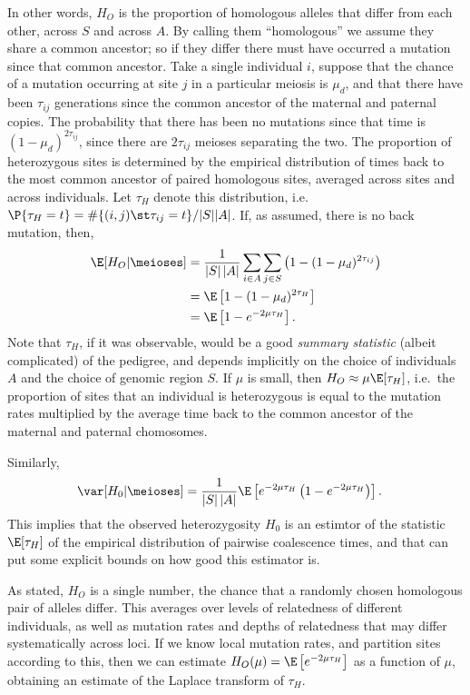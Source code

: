 In other words, $H_O$ is the proportion of homologous alleles that differ from each other, across $S$ and across $A$.
By calling them ``homologous'' we assume they share a common ancestor;
so if they differ there must have occurred a mutation since that common ancestor.
Take a single individual $i$,
suppose that the chance of a mutation occurring at site $j$ in a particular meiosis is $\mu_d$,
and that there have been $\tau_{ij}$ generations since the common ancestor of the maternal and paternal copies.
The probability that there has been no mutations since that time is $(1-\mu_d)^{2 \tau_{ij}}$,
since there are $2 \tau_{ij}$ meioses separating the two.
The proportion of heterozygous sites is determined by the empirical distribution 
of times back to the most common ancestor of paired homologous sites, averaged across sites and across individuals.
Let $\tau_H$ denote this distribution, i.e.\ $\P\{ \tau_H = t \} = \#\{ (i,j) \st \tau_{ij} = t \} / |S||A|$.
If, as assumed, there is no back mutation, then,
\begin{align}
  \E[ H_O \vert \meioses ] &= \frac{1}{|S|\,|A|} \sum_{i \in A} \sum_{j \in S} \left( 1 - (1-\mu_d)^{2 \tau_{ij}} \right) \\
      &= \E\left[ 1-(1-\mu_d)^{2 \tau_H} \right] \\
      &= \E\left[ 1-e^{-2 \mu \tau_H } \right] .
\end{align}
Note that $\tau_H$, if it was observable, would be a good \emph{summary statistic} (albeit complicated) of the pedigree,
and depends implicitly on the choice of individuals $A$ and the choice of genomic region $S$.
If $\mu$ is small, then $H_O \approx \mu \E[ \tau_H ]$,
i.e.\ the proportion of sites that an individual is heterozygous
is equal to the mutation rates multiplied by the average time back to the common ancestor of the maternal and paternal chomosomes.

Similarly, 
\begin{align}
  \var[ H_0 \vert \meioses ] &= \frac{1}{|S|\,|A|} \E\left[ e^{-2 \mu \tau_H } \left( 1 - e^{-2 \mu \tau_H } \right) \right] .
\end{align}
This implies that the observed heterozygosity $H_0$ is an estimtor of the statistic $\E[ \tau_H ]$ of the empirical distribution of pairwise coalescence times,
and that can put some explicit bounds on how good this estimator is.

As stated, $H_O$ is a single number, the chance that a randomly chosen homologous pair of alleles differ.
This averages over levels of relatedness of different individuals,
as well as mutation rates and depths of relatedness that may differ systematically across loci.
If we know local mutation rates, and partition sites according to this,
then we can estimate $H_O(\mu) = \E\left[ e^{-2 \mu \tau_H } \right]$ as a function of $\mu$,
obtaining an estimate of the Laplace transform of $\tau_H$.



